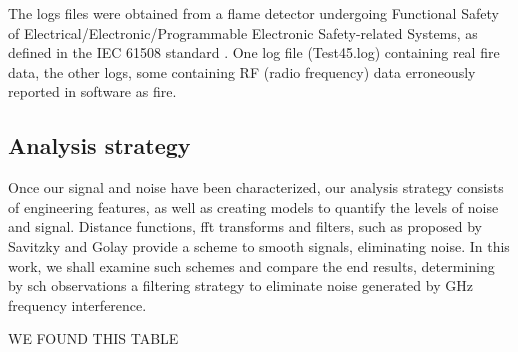 The logs files were obtained from a flame detector undergoing Functional Safety of Electrical/Electronic/Programmable Electronic Safety-related Systems, as defined in the IEC 61508 standard \cite{wiki:IEC61508}. One log file (Test45.log) containing real fire data, the other logs, some containing RF (radio frequency) data erroneously reported in software as fire.

\subsection{Analysis strategy}

Once our signal and noise have been characterized, our analysis strategy consists of engineering features, as well as creating models to quantify the levels of noise and signal. Distance functions, fft transforms and filters, such as proposed by Savitzky and Golay \cite{Savitzky:1964} provide a scheme to smooth signals, eliminating noise. In this work, we shall examine such schemes and compare the end results, determining by sch observations a filtering strategy to eliminate noise generated by GHz frequency interference.

WE FOUND THIS TABLE

